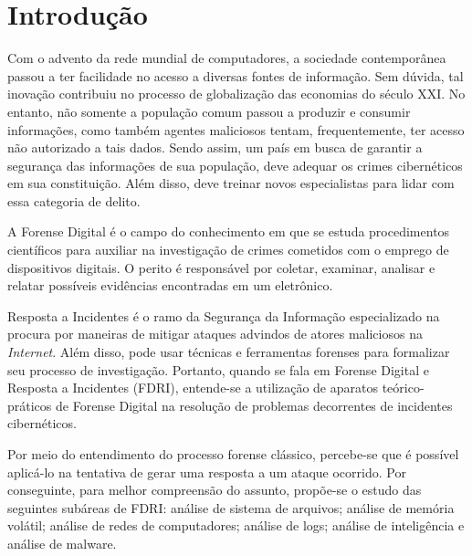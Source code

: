 \section{Introdução}

    \vspace{10.5cm}

    \hspace{1cm}
    Com o advento da rede mundial de computadores, a sociedade contemporânea passou a ter facilidade no acesso a diversas fontes de informação. Sem dúvida, tal inovação contribuiu no processo de globalização das economias do século XXI. No entanto, não somente a população comum passou a produzir e consumir informações, como também agentes maliciosos tentam, frequentemente, ter acesso não autorizado a tais dados. Sendo assim, um país em busca de garantir a segurança das informações de sua população, deve adequar os crimes cibernéticos em sua constituição. Além disso, deve treinar novos especialistas para lidar com essa categoria de delito.
        
    \vspace{4mm}
    
    \hspace{1cm}
    A Forense Digital é o campo do conhecimento em que se estuda procedimentos científicos para auxiliar na investigação de crimes cometidos com o emprego de dispositivos digitais. O perito é responsável por coletar, examinar, analisar e relatar possíveis evidências encontradas em um eletrônico.
    
    \vspace{4mm}
	
	\hspace{1cm}
	Resposta a Incidentes é o ramo da Segurança da Informação especializado na procura por maneiras de mitigar ataques advindos de atores maliciosos na \textit{Internet}. Além disso, pode usar técnicas e ferramentas forenses para formalizar seu processo de investigação. Portanto, quando se fala em Forense Digital e Resposta a Incidentes (FDRI), entende-se a utilização de aparatos teórico-práticos de Forense Digital na resolução de problemas decorrentes de incidentes cibernéticos.
    
    \vspace{4mm}
	
	\hspace{1cm}
	Por meio do entendimento do processo forense clássico, percebe-se que é possível aplicá-lo na tentativa de gerar uma resposta a um ataque ocorrido. Por conseguinte, para melhor compreensão do assunto, propõe-se o estudo das seguintes subáreas de FDRI: análise de sistema de arquivos; análise de memória volátil; análise de redes de computadores; análise de logs; análise de inteligência e análise de malware.
    

